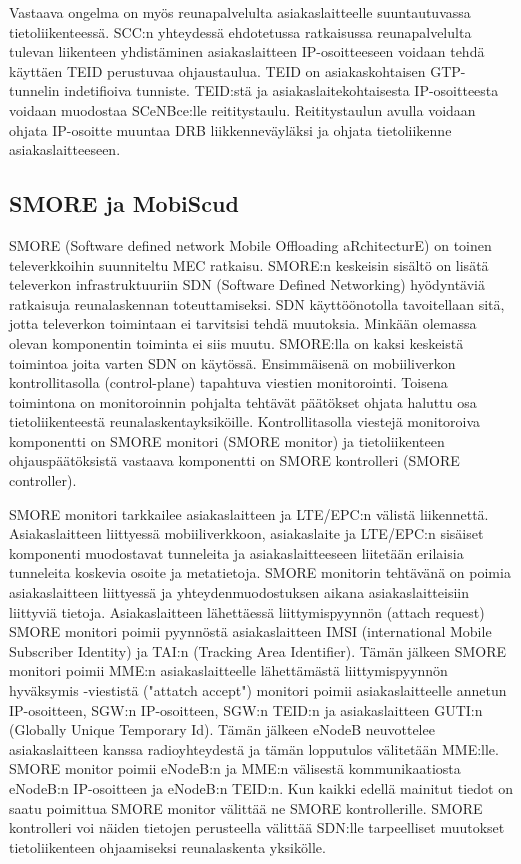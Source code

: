 \documentclass[finnish]{tktltiki2}
\theoremstyle{definition}
\theoremstyle{remark}
\begin{document}
Vastaava ongelma on myös reunapalvelulta asiakaslaitteelle suuntautuvassa tietoliikenteessä.
SCC:n yhteydessä ehdotetussa ratkaisussa reunapalvelulta tulevan liikenteen yhdistäminen asiakaslaitteen IP-osoitteeseen voidaan tehdä käyttäen TEID perustuvaa ohjaustaulua.
TEID on asiakaskohtaisen GTP-tunnelin indetifioiva tunniste.
TEID:stä ja asiakaslaitekohtaisesta IP-osoitteesta voidaan muodostaa SCeNBce:lle reititystaulu. 
Reititystaulun avulla voidaan ohjata IP-osoitte muuntaa DRB liikkenneväyläksi ja ohjata tietoliikenne asiakaslaitteeseen.

 
\subsection{SMORE ja MobiScud}
SMORE (Software defined network Mobile Offloading aRchitecturE) \cite{cho2014smore} on toinen televerkkoihin suunniteltu MEC ratkaisu.
SMORE:n keskeisin sisältö on lisätä televerkon infrastruktuuriin SDN (Software Defined Networking) hyödyntäviä ratkaisuja reunalaskennan toteuttamiseksi.
SDN käyttöönotolla tavoitellaan sitä, jotta televerkon toimintaan ei tarvitsisi tehdä muutoksia. Minkään olemassa olevan komponentin toiminta ei siis muutu.
SMORE:lla on kaksi keskeistä toimintoa joita varten SDN on käytössä. 
Ensimmäisenä on mobiiliverkon kontrollitasolla (control-plane) tapahtuva viestien monitorointi. 
Toisena toimintona on monitoroinnin pohjalta tehtävät päätökset ohjata haluttu osa tietoliikenteestä reunalaskentayksiköille.
Kontrollitasolla viestejä monitoroiva komponentti on SMORE monitori (SMORE monitor) ja tietoliikenteen ohjauspäätöksistä vastaava komponentti on SMORE kontrolleri (SMORE controller).

SMORE monitori tarkkailee asiakaslaitteen ja LTE/EPC:n välistä liikennettä.
Asiakaslaitteen liittyessä mobiiliverkkoon, asiakaslaite ja LTE/EPC:n sisäiset komponenti muodostavat tunneleita ja asiakaslaitteeseen liitetään erilaisia tunneleita koskevia osoite ja metatietoja.
SMORE monitorin tehtävänä on poimia asiakaslaitteen liittyessä ja yhteydenmuodostuksen aikana asiakaslaitteisiin liittyviä tietoja.
Asiakaslaitteen lähettäessä liittymispyynnön (attach request) SMORE monitori poimii pyynnöstä asiakaslaitteen IMSI (international Mobile Subscriber Identity) ja TAI:n (Tracking Area Identifier). 
Tämän jälkeen SMORE monitori poimii MME:n asiakaslaitteelle lähettämästä liittymispyynnön hyväksymis -viestistä ("attatch accept") monitori poimii asiakaslaitteelle annetun IP-osoitteen, SGW:n IP-osoitteen, SGW:n TEID:n ja asiakaslaitteen GUTI:n (Globally Unique Temporary Id).
Tämän jälkeen eNodeB neuvottelee asiakaslaitteen kanssa radioyhteydestä ja tämän lopputulos välitetään MME:lle. SMORE monitor poimii eNodeB:n ja MME:n välisestä kommunikaatiosta eNodeB:n IP-osoitteen ja eNodeB:n TEID:n. 
Kun kaikki edellä mainitut tiedot on saatu poimittua SMORE monitor välittää ne SMORE kontrollerille.
SMORE kontrolleri voi näiden tietojen perusteella välittää SDN:lle tarpeelliset muutokset tietoliikenteen ohjaamiseksi reunalaskenta yksikölle. 
\end{document}
